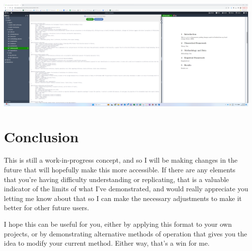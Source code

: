 \documentclass[12pt]{article}
\begin{document}
\includegraphics[width=1\textwidth]{Instructions/project_template_screenshots/project_template_36.png} \\

\section{Conclusion}

This is still a work-in-progress concept, and so I will be making changes in the future that will hopefully make this more accessible. If there are any elements that you're having difficulty understanding or replicating, that is a valuable indicator of the limits of what I've demonstrated, and would really appreciate you letting me know about that so I can make the necessary adjustments to make it better for other future users.  

I hope this can be useful for you, either by applying this format to your own projects, or by demonstrating alternative methods of operation that gives you the idea to modify your current method. Either way, that's a win for me. 
\end{document}
